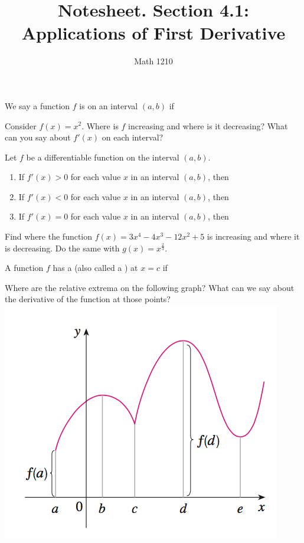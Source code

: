 \documentclass[12pt, a4paper]{article}
\author{Math 1210}
\title{Notesheet. Section 4.1: Applications of First Derivative}
\date{}
\begin{document}
\maketitle
\nameline
\begin{defi}
  We say a function \(f\) is  on an interval \((a,b)\)
  if
\end{defi}
\begin{ex}
  Consider \(f(x) = x^2\). Where is \(f\) increasing and where is it
  decreasing? What can you say about \(f'(x)\) on each interval?
\end{ex}
\begin{thrm} Let \(f\) be a differentiable function on the interval \((a,b)\).
  \begin{enumerate}
  \item If \(f'(x) > 0\) for each value \(x\) in an interval
    \((a,b)\), then
  \item If \(f'(x) < 0\) for each value \(x\) in an interval
    \((a,b)\), then
  \item If \(f'(x) = 0\) for each value \(x\) in an interval \((a,b)\),
    then
  \end{enumerate}
\end{thrm}
\begin{ex}
  Find where the function \(f(x) = 3x^4 - 4x^3 - 12x^2 + 5\) is
  increasing and where it is decreasing. Do the same with \(g(x) =
  x^\frac{2}{3}\).
\end{ex}
\begin{defi}
  A function \(f\) has a  (also called a
  ) at \(x=c\) if
\end{defi}
\begin{ex}
  Where are the relative extrema on the following graph? What can we
  say about the derivative of the function at those points?\\
  \includegraphics[scale=0.5]{images/graph-with-extrema}
\end{ex}
\end{document}
